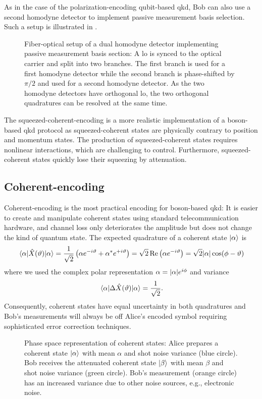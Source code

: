 As in the case of the polarization-encoding qubit-based \gls{qkd}, Bob can also use a second homodyne detector to implement passive measurement basis selection.
Such a setup is illustrated in .
\begin{figure}[htb]
	\centering
	
	\caption{Fiber-optical setup of a dual homodyne detector implementing passive measurement basis section: A \gls{lo} is synced to the optical carrier and split into two branches. The first branch is used for a first homodyne detector while the second branch is phase-shifted by $\pi/2$ and used for a second homodyne detector. As the two homodyne detectors have orthogonal \gls{lo}, the two orthogonal quadratures can be resolved at the same time.}\label{fig:coherent_receiver_passive}
\end{figure}
The squeezed-coherent-encoding is a more realistic implementation of a boson-based \gls{qkd} protocol as squeezed-coherent states are physically contrary to position and momentum states.
The production of squeezed-coherent states requires nonlinear interactions, which are challenging to control.
Furthermore, squeezed-coherent states quickly lose their squeezing by attenuation.

\FloatBarrier
\subsection{Coherent-encoding}

Coherent-encoding is the most practical encoding for boson-based \gls{qkd}:
It is easier to create and manipulate coherent states using standard telecommunication hardware, and channel loss only deteriorates the amplitude but does not change the kind of quantum state.
The expected quadrature of a coherent state $\ket{\alpha}$ is
\begin{equation}
	\expval{\hat{X}(\vartheta)}{\alpha}
	=
	\frac{1}{\sqrt{2}}
	\left(
		\alpha
		e^{-i\vartheta}
		+
		\alpha^*
		e^{+i\vartheta}
	\right)
	=
	\sqrt{2}
	\operatorname{\operatorname{Re}}\left(
		\alpha
		e^{-i\vartheta}
	\right)
	=
	\sqrt{2}
	\abs{\alpha}
	\cos(\phi-\vartheta)
\end{equation}
where we used the complex polar representation $\alpha=\abs{\alpha}e^{i\phi}$ and variance~\cite[p.~59]{Barnett2002}
\begin{equation}
	\expval{\Delta\hat{X}(\vartheta)}{\alpha}
	=
	\frac{1}{\sqrt{2}}
	.
\end{equation}
Consequently, coherent states have equal uncertainty in both quadratures and Bob's measurements will always be off Alice's encoded symbol requiring sophisticated error correction techniques.
\begin{figure}[htb]
	\centering
	
	\caption{Phase space representation of coherent states: Alice prepares a coherent state $\ket{\alpha}$ with mean $\alpha$ and shot noise variance (blue circle). Bob receives the attenuated coherent state $\ket{\beta}$ with mean $\beta$ and shot noise variance (green circle). Bob's measurement (orange circle) has an increased variance due to other noise sources, e.g., electronic noise.}
\end{figure}

